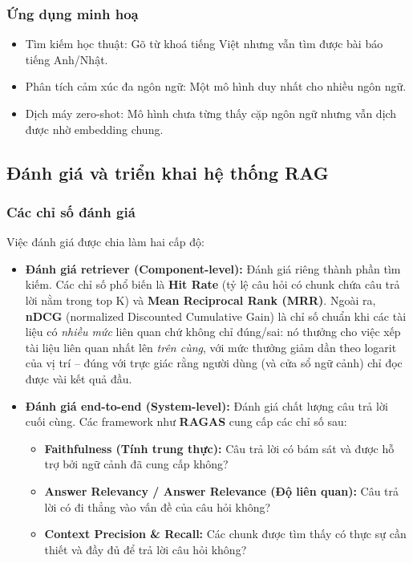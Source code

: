 \subsubsection*{Ứng dụng minh hoạ}
\begin{itemize}
	\item Tìm kiếm học thuật: Gõ từ khoá tiếng Việt nhưng vẫn tìm được bài báo tiếng Anh/Nhật.
	\item Phân tích cảm xúc đa ngôn ngữ: Một mô hình duy nhất cho nhiều ngôn ngữ.
	\item Dịch máy zero-shot: Mô hình chưa từng thấy cặp ngôn ngữ nhưng vẫn dịch được nhờ embedding chung.
\end{itemize}


\subsection{Đánh giá và triển khai hệ thống RAG}
\label{ssec:rag_evaluation_production}

\subsubsection{Các chỉ số đánh giá}
Việc đánh giá được chia làm hai cấp độ:
\begin{itemize}
	\item \textbf{Đánh giá retriever (Component-level):} Đánh giá riêng thành phần tìm kiếm. Các chỉ số phổ biến là \textbf{Hit Rate} (tỷ lệ câu hỏi có chunk chứa câu trả lời nằm trong top K) và \textbf{Mean Reciprocal Rank (MRR)}. Ngoài ra, \textbf{nDCG} (normalized Discounted Cumulative Gain) là chỉ số chuẩn khi các tài liệu có \emph{nhiều mức} liên quan chứ không chỉ đúng/sai: nó thưởng cho việc xếp tài liệu liên quan nhất lên \emph{trên cùng}, với mức thưởng giảm dần theo logarit của vị trí -- đúng với trực giác rằng người dùng (và cửa sổ ngữ cảnh) chỉ đọc được vài kết quả đầu.
	\item \textbf{Đánh giá end-to-end (System-level):} Đánh giá chất lượng câu trả lời cuối cùng. Các framework như \textbf{RAGAS} cung cấp các chỉ số sau:
	\begin{itemize}
		\item \textbf{Faithfulness (Tính trung thực):} Câu trả lời có bám sát và được hỗ trợ bởi ngữ cảnh đã cung cấp không?
		\item \textbf{Answer Relevancy / Answer Relevance (Độ liên quan):} Câu trả lời có đi thẳng vào vấn đề của câu hỏi không?
		\item \textbf{Context Precision \& Recall:} Các chunk được tìm thấy có thực sự cần thiết và đầy đủ để trả lời câu hỏi không?
	\end{itemize}
\end{itemize}

